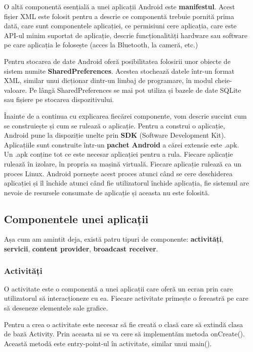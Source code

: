 \documentclass[12pt,a4paper]{article}
\begin{document}
O altă componentă esențială a unei aplicații Android este \textbf{manifestul}. Acest fișier XML este folosit pentru a descrie ce componentă trebuie pornită prima dată, care sunt componentele aplicației, ce permisiuni cere aplicația, care este API-ul minim suportat de aplicație, descrie funcționalități hardware sau software pe care aplicația le folosește (acces la Bluetooth, la cameră, etc.)

Pentru stocarea de date Android oferă posibilitatea folosirii unor obiecte de sistem numite \textbf{SharedPreferences}. Acestea stochează datele într-un format XML, similar unui dicționar dintr-un limbaj de programare, în modul cheie-valoare. Pe lângă SharedPreferences se mai pot utiliza și bazele de date SQLite sau fișiere pe stocarea dispozitivului.

Înainte de a continua cu explicarea fiecărei componente, vom descrie succint cum se construiește și cum se rulează o aplicație. Pentru a construi o aplicație, Android pune la dispoziție unelte prin \textbf{SDK} (Software Development Kit). Aplicațiile sunt construite într-un \textbf{pachet Android} a cărei extensie este .apk. Un .apk conține tot ce este necesar aplicației pentru a rula. Fiecare aplicație rulează în izolare, în propria sa mașină virtuală. Fiecare aplicație rulează ca un proces Linux. Android pornește acest proces atunci când se cere deschiderea aplicației și îl închide atunci când fie utilizatorul închide aplicația, fie sistemul are nevoie de resursele consumate de aplicație și aceasta nu este folosită.

\subsection{Componentele unei aplicații}
Așa cum am amintit deja, există patru tipuri de componente: \textbf{activități}, \textbf{servicii}, \textbf{content provider}, \textbf{broadcast receiver}.

\subsubsection{Activități}
O activitate este o componentă a unei aplicații care oferă un ecran prin care utilizatorul să interacționeze cu ea. Fiecare activitate primește o fereastră pe care să deseneze elementele sale grafice.

Pentru a crea o activitate este necesar să fie creată o clasă care să extindă clasa de bază Activity. Prin aceasta ni se va cere să implementăm metoda onCreate(). Această metodă este entry-point-ul în activitate, similar unui main().
\end{document}
